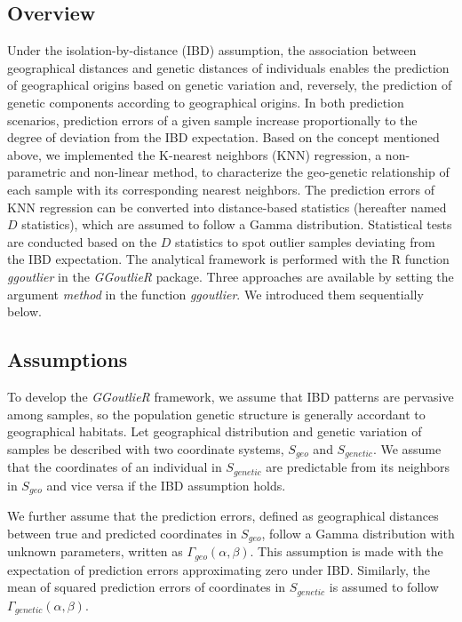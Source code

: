 \documentclass[11pt]{article}
\begin{document}
\subsection*{Overview}

Under the isolation-by-distance (IBD) assumption, the association between geographical distances and genetic distances of individuals enables the prediction of geographical origins based on genetic variation and, reversely, the prediction of genetic components according to geographical origins.
In both prediction scenarios, prediction errors of a given sample increase proportionally to the degree of deviation from the IBD expectation.
Based on the concept mentioned above, we implemented the K-nearest neighbors (KNN) regression, a non-parametric and non-linear method, to characterize the geo-genetic relationship of each sample with its corresponding nearest neighbors.
The prediction errors of KNN regression can be converted into distance-based statistics (hereafter named $D$ statistics), which are assumed to follow a Gamma distribution.
Statistical tests are conducted based on the $D$ statistics to spot outlier samples deviating from the IBD expectation.
The analytical framework is performed with the R function \textit{ggoutlier} in the \textit{GGoutlieR} package.
Three approaches are available by setting the argument \textit{method} in the function \textit{ggoutlier}.
We introduced them sequentially below.

\subsection*{Assumptions}

To develop the \textit{GGoutlieR} framework, we assume that IBD patterns are pervasive among samples, so the population genetic structure is generally accordant to geographical habitats.
Let geographical distribution and genetic variation of samples be described with two coordinate systems, $S_{geo}$ and $S_{genetic}$.
We assume that the coordinates of an individual in $S_{genetic}$ are predictable from its neighbors in $S_{geo}$ and vice versa if the IBD assumption holds.

We further assume that the prediction errors, defined as geographical distances between true and predicted coordinates in $S_{geo}$, follow a Gamma distribution with unknown parameters, written as $\Gamma_{geo}(\alpha,\beta)$. 
This assumption is made with the expectation of prediction errors approximating zero under IBD.
Similarly, the mean of squared prediction errors of coordinates in $S_{genetic}$ is assumed to follow $\Gamma_{genetic}(\alpha,\beta)$.
\end{document}
